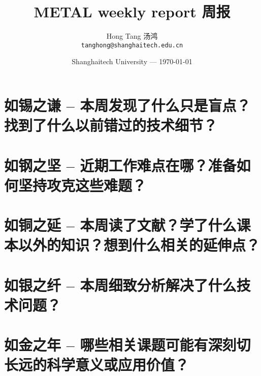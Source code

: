 \documentclass{article}
\title{METAL weekly report 周报}
\author{Hong Tang 汤鸿\\ 
\texttt{tanghong@shanghaitech.edu.cn}} %
\date{Shanghaitech University --- \today} %
\begin{document}
\maketitle
\section{如锡之谦 -- 本周发现了什么只是盲点？找到了什么以前错过的技术细节？}

\section{如钢之坚 -- 近期工作难点在哪？准备如何坚持攻克这些难题？}

\section{如铜之延 -- 本周读了文献？学了什么课本以外的知识？想到什么相关的延伸点？}

\section{如银之纤 -- 本周细致分析解决了什么技术问题？}

\section{如金之年 -- 哪些相关课题可能有深刻切长远的科学意义或应用价值？}
\end{document}
